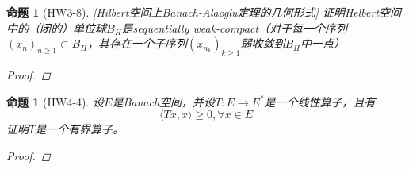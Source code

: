 \documentclass{article}                     %
\numberwithin{equation}{section}            %
\numberwithin{figure}{section}              %
\numberwithin{table}{section}               %
\newtheorem{proposition}[theorem]{\indent 命题}
\begin{document}
\begin{proposition}[HW3-8][Hilbert空间上Banach-Alaoglu定理的几何形式]
    证明Helbert空间中的（闭的）单位球$B_H$是sequentially weak-compact（对于每一个序列$(x_n)_{n\ge 1}\subset B_H$，其存在一个子序列$(x_{n_k})_{k\ge 1}$弱收敛到$B_H$中一点）
    \begin{proof}
        
    \end{proof}
\end{proposition}








\begin{proposition}[HW4-4]
    设$E$是Banach空间，并设$T:E\to E^{\ast}$是一个线性算子，且有
    $$\langle Tx,x\rangle\ge 0,\forall x\in E $$
    证明$T$是一个有界算子。
    \begin{proof}
        
    \end{proof}
\end{proposition}







\end{document}
